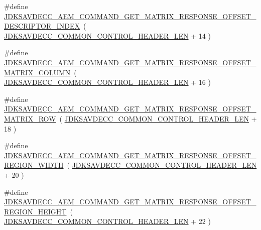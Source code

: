 \begin{DoxyCompactItemize}
\#define \hyperlink{group__command__get__matrix__response_gaa34f4ff1cf9d8b2cbf6feff537d94927}{J\+D\+K\+S\+A\+V\+D\+E\+C\+C\+\_\+\+A\+E\+M\+\_\+\+C\+O\+M\+M\+A\+N\+D\+\_\+\+G\+E\+T\+\_\+\+M\+A\+T\+R\+I\+X\+\_\+\+R\+E\+S\+P\+O\+N\+S\+E\+\_\+\+O\+F\+F\+S\+E\+T\+\_\+\+D\+E\+S\+C\+R\+I\+P\+T\+O\+R\+\_\+\+I\+N\+D\+EX}~( \hyperlink{group__jdksavdecc__avtp__common__control__header_gaae84052886fb1bb42f3bc5f85b741dff}{J\+D\+K\+S\+A\+V\+D\+E\+C\+C\+\_\+\+C\+O\+M\+M\+O\+N\+\_\+\+C\+O\+N\+T\+R\+O\+L\+\_\+\+H\+E\+A\+D\+E\+R\+\_\+\+L\+EN} + 14 )
\item 
\#define \hyperlink{group__command__get__matrix__response_gaa8410f10b271dbc4884e47b36cc68f91}{J\+D\+K\+S\+A\+V\+D\+E\+C\+C\+\_\+\+A\+E\+M\+\_\+\+C\+O\+M\+M\+A\+N\+D\+\_\+\+G\+E\+T\+\_\+\+M\+A\+T\+R\+I\+X\+\_\+\+R\+E\+S\+P\+O\+N\+S\+E\+\_\+\+O\+F\+F\+S\+E\+T\+\_\+\+M\+A\+T\+R\+I\+X\+\_\+\+C\+O\+L\+U\+MN}~( \hyperlink{group__jdksavdecc__avtp__common__control__header_gaae84052886fb1bb42f3bc5f85b741dff}{J\+D\+K\+S\+A\+V\+D\+E\+C\+C\+\_\+\+C\+O\+M\+M\+O\+N\+\_\+\+C\+O\+N\+T\+R\+O\+L\+\_\+\+H\+E\+A\+D\+E\+R\+\_\+\+L\+EN} + 16 )
\item 
\#define \hyperlink{group__command__get__matrix__response_ga8b1d1ff7aba81fa92ac8f2ed1621af8f}{J\+D\+K\+S\+A\+V\+D\+E\+C\+C\+\_\+\+A\+E\+M\+\_\+\+C\+O\+M\+M\+A\+N\+D\+\_\+\+G\+E\+T\+\_\+\+M\+A\+T\+R\+I\+X\+\_\+\+R\+E\+S\+P\+O\+N\+S\+E\+\_\+\+O\+F\+F\+S\+E\+T\+\_\+\+M\+A\+T\+R\+I\+X\+\_\+\+R\+OW}~( \hyperlink{group__jdksavdecc__avtp__common__control__header_gaae84052886fb1bb42f3bc5f85b741dff}{J\+D\+K\+S\+A\+V\+D\+E\+C\+C\+\_\+\+C\+O\+M\+M\+O\+N\+\_\+\+C\+O\+N\+T\+R\+O\+L\+\_\+\+H\+E\+A\+D\+E\+R\+\_\+\+L\+EN} + 18 )
\item 
\#define \hyperlink{group__command__get__matrix__response_ga7dfe390bf287b598437bda32566438e0}{J\+D\+K\+S\+A\+V\+D\+E\+C\+C\+\_\+\+A\+E\+M\+\_\+\+C\+O\+M\+M\+A\+N\+D\+\_\+\+G\+E\+T\+\_\+\+M\+A\+T\+R\+I\+X\+\_\+\+R\+E\+S\+P\+O\+N\+S\+E\+\_\+\+O\+F\+F\+S\+E\+T\+\_\+\+R\+E\+G\+I\+O\+N\+\_\+\+W\+I\+D\+TH}~( \hyperlink{group__jdksavdecc__avtp__common__control__header_gaae84052886fb1bb42f3bc5f85b741dff}{J\+D\+K\+S\+A\+V\+D\+E\+C\+C\+\_\+\+C\+O\+M\+M\+O\+N\+\_\+\+C\+O\+N\+T\+R\+O\+L\+\_\+\+H\+E\+A\+D\+E\+R\+\_\+\+L\+EN} + 20 )
\item 
\#define \hyperlink{group__command__get__matrix__response_gad0fda621c94ecb4ba471f52afc78111a}{J\+D\+K\+S\+A\+V\+D\+E\+C\+C\+\_\+\+A\+E\+M\+\_\+\+C\+O\+M\+M\+A\+N\+D\+\_\+\+G\+E\+T\+\_\+\+M\+A\+T\+R\+I\+X\+\_\+\+R\+E\+S\+P\+O\+N\+S\+E\+\_\+\+O\+F\+F\+S\+E\+T\+\_\+\+R\+E\+G\+I\+O\+N\+\_\+\+H\+E\+I\+G\+HT}~( \hyperlink{group__jdksavdecc__avtp__common__control__header_gaae84052886fb1bb42f3bc5f85b741dff}{J\+D\+K\+S\+A\+V\+D\+E\+C\+C\+\_\+\+C\+O\+M\+M\+O\+N\+\_\+\+C\+O\+N\+T\+R\+O\+L\+\_\+\+H\+E\+A\+D\+E\+R\+\_\+\+L\+EN} + 22 )

\end{DoxyCompactItemize}
